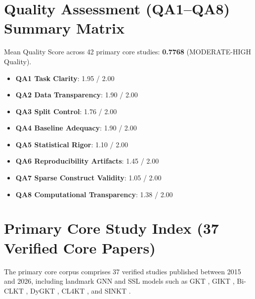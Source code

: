 \documentclass[10pt,journal,compsoc]{IEEEtran}
\begin{document}
\section{Quality Assessment (QA1--QA8) Summary Matrix}
Mean Quality Score across 42 primary core studies: \textbf{0.7768} (MODERATE-HIGH Quality).
\begin{itemize}
    \item \textbf{QA1 Task Clarity}: 1.95 / 2.00
    \item \textbf{QA2 Data Transparency}: 1.90 / 2.00
    \item \textbf{QA3 Split Control}: 1.76 / 2.00
    \item \textbf{QA4 Baseline Adequacy}: 1.90 / 2.00
    \item \textbf{QA5 Statistical Rigor}: 1.10 / 2.00
    \item \textbf{QA6 Reproducibility Artifacts}: 1.45 / 2.00
    \item \textbf{QA7 Sparse Construct Validity}: 1.05 / 2.00
    \item \textbf{QA8 Computational Transparency}: 1.38 / 2.00
\end{itemize}

\section{Primary Core Study Index (37 Verified Core Papers)}
The primary core corpus comprises 37 verified studies published between 2015 and 2026, including landmark GNN and SSL models such as GKT \cite{KT004_GKT_2019}, GIKT \cite{KT010_GIKT_2021}, Bi-CLKT \cite{KT011_BiCLKT_2022}, DyGKT \cite{KT038_DyGKT_2024}, CL4KT \cite{KT039_CL4KT_2022}, and SINKT \cite{KT044_SINKT_2024}.
\end{document}
